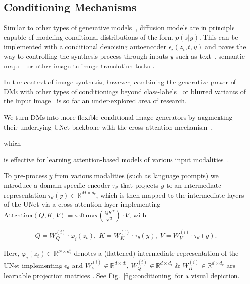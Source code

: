 \subsection{Conditioning Mechanisms}

\label{subsec:conditioning}

Similar to other types of generative models~\cite{DBLP:journals/corr/MirzaO14,NIPS2015_8d55a249}, diffusion models are in principle capable of modeling conditional distributions of the form $p(z \vert y)$. This can be implemented with a conditional denoising autoencoder $\epsilon_\theta(z_{t},t,y)$ and paves the way to controlling the synthesis process through inputs $y$ such as text~\cite{Reed2016GenerativeAT}, semantic maps ~\cite{spade, DBLP:conf/cvpr/IsolaZZE17} or other image-to-image translation tasks \cite{Isola2017ImagetoImageTW}.

 In the context of image synthesis, however, combining the generative power of DMs with other types of conditionings beyond class-labels~\cite{DBLP:journals/corr/abs-2105-05233} or blurred variants of the input image~\cite{DBLP:journals/corr/abs-2104-07636} is so far an under-explored area of research.

We turn DMs into more flexible conditional image generators by augmenting their underlying UNet backbone with the cross-attention mechanism~\cite{DBLP:conf/nips/VaswaniSPUJGKP17}, 

which 

is effective for learning attention-based models of various input modalities~\cite{DBLP:conf/icml/JaegleGBVZC21,DBLP:journals/corr/abs-2107-14795}. 

To pre-process $y$ from various modalities (such as language prompts) we introduce a domain specific encoder $\tau_\theta$ that projects $y$ to an intermediate representation $\tau_\theta(y) \in \mathbb{R}^{M\times d_\tau}$, which is then mapped to the intermediate layers of the UNet via a cross-attention layer implementing $\text{Attention}(Q, K, V) = \text{softmax}\left(\frac{QK^T}{\sqrt{d}}\right) \cdot V$, with

\begin{equation*}
Q = W^{(i)}_Q \cdot  \varphi_i(z_t), \; K = W^{(i)}_K \cdot \tau_\theta(y),
  \; V = W^{(i)}_V \cdot \tau_\theta(y) . \nonumber

\end{equation*}

Here, $\varphi_i(z_t) \in \mathbb{R}^{N \times d^i_\epsilon}$ denotes a (flattened) intermediate representation of the UNet implementing 
$\epsilon_\theta$ and $W^{(i)}_V \in \mathbb{R}^{d \times d^i_\epsilon}$, $W^{(i)}_Q \in \mathbb{R}^{d \times d_\tau} $ \& $W^{(i)}_K \in \mathbb{R}^{d \times d_\tau}$ are learnable projection matrices \cite{DBLP:conf/nips/VaswaniSPUJGKP17, DBLP:conf/icml/JaegleGBVZC21}. See Fig.~\ref{fig:conditioning} for a visual depiction.

